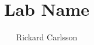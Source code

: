 \documentclass{LabReport}
\author{Rickard Carlsson}
\title{Lab Name}
\begin{document}
\EltigreTitle
\tableofcontents
\newpage






\end{document}
